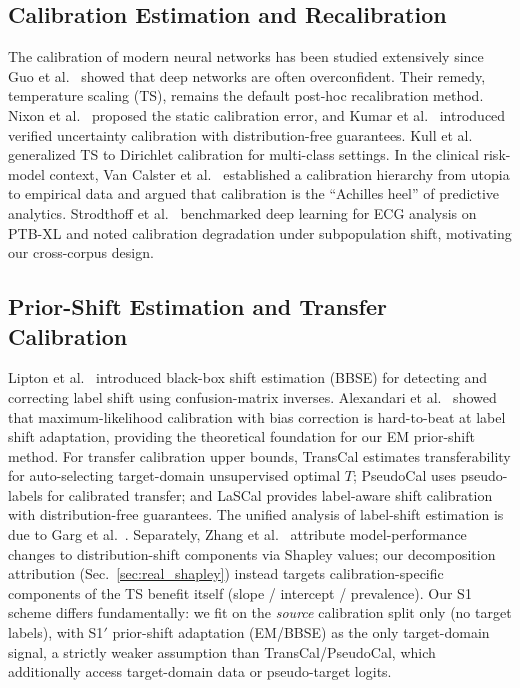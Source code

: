 \documentclass[final,5p,times,nonatbib]{elsarticle}
\begin{document}
\subsection{Calibration Estimation and Recalibration}
The calibration of modern neural networks has been studied extensively
since Guo et al.\ \cite{guo2017calibration} showed that deep networks are
often overconfident. Their remedy, temperature scaling (TS), remains the
default post-hoc recalibration method.
Nixon et al.\ \cite{nixon2019} proposed the static calibration error,
and Kumar et al.\ \cite{kumar2019} introduced verified uncertainty
calibration with distribution-free guarantees. Kull et al.\
\cite{kull2019dirichlet} generalized TS to Dirichlet calibration for
multi-class settings. In the clinical risk-model context, Van Calster
et al.\ \cite{vancalster2016,vancalster2019} established a calibration
hierarchy from utopia to empirical data and argued that calibration is
the ``Achilles heel'' of predictive analytics. Strodthoff et al.\
\cite{strodthoff2021} benchmarked deep learning for ECG analysis on
PTB-XL and noted calibration degradation under subpopulation shift,
motivating our cross-corpus design.

\subsection{Prior-Shift Estimation and Transfer Calibration}
Lipton et al.\ \cite{lipton2018bbs} introduced black-box shift
estimation (BBSE) for detecting and correcting label shift using
confusion-matrix inverses. Alexandari et al.\ \cite{alexandari2020}
showed that maximum-likelihood calibration with bias correction is
hard-to-beat at label shift adaptation, providing the theoretical
foundation for our EM prior-shift method. For transfer calibration
upper bounds, TransCal \cite{transcal2020} estimates transferability
for auto-selecting target-domain unsupervised optimal $T$; PseudoCal
\cite{pseudocal2024} uses pseudo-labels for calibrated transfer; and
LaSCal \cite{lascal2024} provides label-aware shift calibration with
distribution-free guarantees. The unified analysis of label-shift
estimation is due to Garg et al.\ \cite{garg2020labelshift}.
Separately, Zhang et al.\ \cite{zhang2023shapley} attribute
model-performance changes to distribution-shift components via
Shapley values; our decomposition attribution
(Sec.~\ref{sec:real_shapley}) instead targets calibration-specific
components of the TS benefit itself (slope / intercept / prevalence).
Our S1 scheme differs fundamentally: we fit on the \emph{source}
calibration split only (no target labels), with S1$'$ prior-shift
adaptation (EM/BBSE) as the only target-domain signal, a strictly
weaker assumption than TransCal/PseudoCal, which additionally access
target-domain data or pseudo-target logits.
\end{document}
